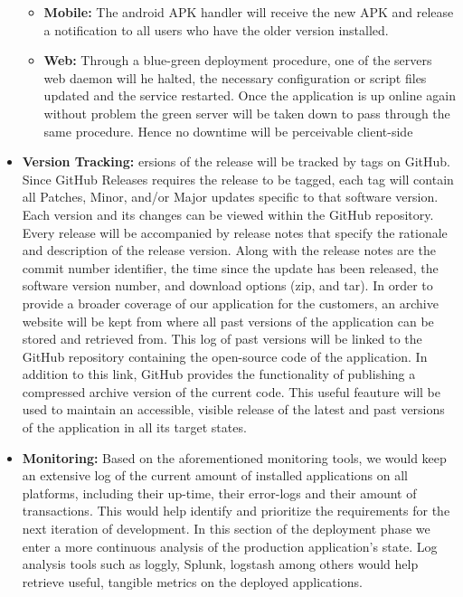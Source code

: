 \documentclass[12pt]{report}
\begin{document}
\begin{itemize}
\begin{itemize}
        \item \textbf{Mobile:} The android APK handler will receive the new APK and release a notification to all users who have the older version installed.
        \item \textbf{Web:} Through a blue-green deployment procedure, one of the servers web daemon will he halted, the necessary configuration or script files updated and the service restarted. Once the application is up online again without problem the green server will be taken down to pass through the same procedure. Hence no downtime will be perceivable client-side
    \end{itemize}
    \item \textbf{Version Tracking:} ersions of the release will be tracked by tags on GitHub.
    Since GitHub Releases requires the release to be tagged, each tag will contain all Patches, Minor, and/or Major updates specific to that software version. Each version and its changes can be viewed within the GitHub repository. Every release will be accompanied by release notes that specify the rationale and description of the release version. Along with the release notes are the commit number identifier, the time since the update has been released, the software version number, and download options (zip, and tar). In order to provide a broader coverage of our application for the customers, an archive website will be kept from where all past versions of the application can be stored and retrieved from. This log of past versions will be linked to the GitHub repository containing the open-source code of the application. In addition to this link, GitHub provides the functionality of publishing a compressed archive version of the current code. This useful feauture will be used to maintain an accessible, visible release of the latest and past versions of the application in all its target states. 
    \item \textbf{Monitoring:} Based on the aforementioned monitoring tools, we would keep an extensive log of the current amount of installed applications on all platforms, including their up-time, their error-logs and their amount of transactions. This would help identify and prioritize the requirements for the next iteration of development. In this section of the deployment phase we enter a more continuous analysis of the production application's state. Log analysis tools such as loggly, Splunk, logstash among others would help retrieve useful, tangible metrics on the deployed applications.
\end{itemize}
\end{document}
